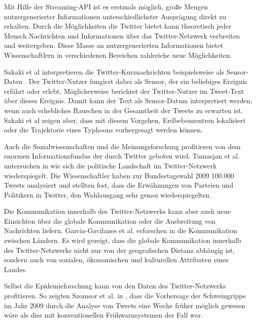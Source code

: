 		Mit Hilfe der Streaming-API ist es erstmals möglich, große Mengen nutzergenerierter Informationen unterschiedlichster Ausprägung direkt zu erhalten. 
		Durch die Möglichkeiten die Twitter bietet kann theoretisch jeder Mensch Nachrichten und Informationen über das Twitter-Netzwerk verbreiten und weitergeben. 
		Diese Masse an nutzergenerierten Informationen bietet Wissenschaftlern in verschiedenen Bereichen zahlreiche neue Möglichkeiten.

		Sakaki et al interpretieren die Twitter-Kurznachrichten beispielsweise als Sensor-Daten \cite{Sakaki2010}.
		Der Twitter-Nutzer fungiert dabei als Sensor, der ein beliebiges Ereignis erfährt oder erlebt.
		Möglicherweise berichtet der Twitter-Nutzer im Tweet-Text über dieses Ereignis. 
		Damit kann der Text als Sensor-Datum interpretiert werden, wenn auch erhebliches Rauschen in der Gesamtheit der Tweets zu erwarten ist.    
		Sakaki et al zeigen aber, dass mit diesem Vorgehen, Erdbebenzentren lokalisiert oder die Trajektorie eines Typhoons vorhergesagt werden können.   
		
		Auch die Sozialwissenschaften und die Meinungsforschung profitieren von dem enormen Informationsfundus der durch Twitter geboten wird.  
		Tumasjan et al. untersuchen in \cite{Tumasjan2011} wie sich die politische Landschaft im Twitter-Netzwerk wiederspiegelt. 
		Die Wissenschaftler haben zur Bundestagswahl 2009 100.000 Tweets analysiert und stellten fest, dass die Erwähnungen von Parteien und Politikern in Twitter, den Wahlausgang sehr genau wiederspiegelten.  
		
		Die Kommunikation innerhalb des Twitter-Netzwerks kann aber auch neue Einsichten über die globale Kommunikation oder die Ausbreitung von Nachrichten liefern.
		Garcia-Gavilanes et al. erforschen in \cite{Garcia-Gavilanes2014} die Kommunikation zwischen Ländern. 
		Es wird gezeigt, dass die globale Kommunikation innerhalb des Twitter-Netzwerks nicht nur von der geografischen Distanz abhängig ist, sondern auch von sozialen, ökonomischen und kulturellen Attributen eines Landes.   

		Selbst die Epidemieforschung kann von den Daten des Twitter-Netzwerks profitieren. 
		So zeigten Szomsor et al. in \cite{Szomszor2011}, dass die Vorhersage der Schweingrippe im Jahr 2009 durch die Analyse von Tweets eine Woche früher möglich gewesen wäre als dies mit konventionellen Frühwarnsystemen der Fall war. 


